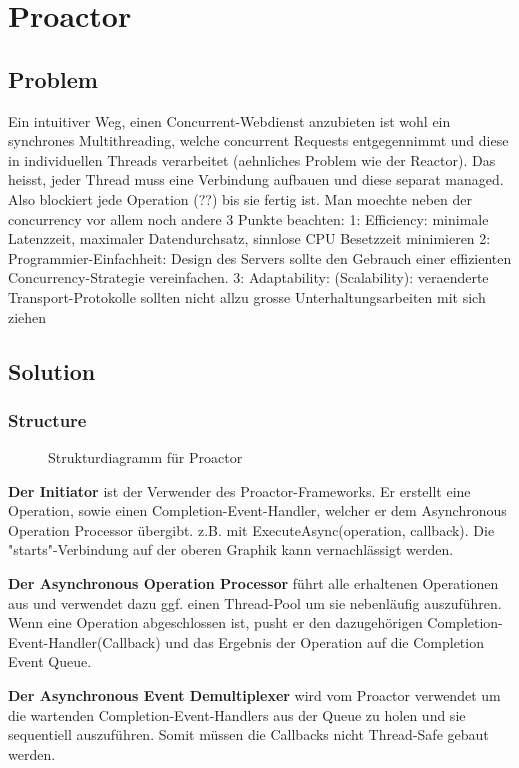 \chapter{Proactor}

\section{Problem}
Ein intuitiver Weg, einen Concurrent-Webdienst anzubieten ist wohl ein synchrones Multithreading, welche concurrent Requests entgegennimmt und diese in individuellen Threads verarbeitet (aehnliches Problem wie der Reactor). Das heisst, jeder Thread muss eine Verbindung aufbauen und diese separat managed. Also blockiert jede Operation (??) bis sie fertig ist.
Man moechte neben der concurrency vor allem noch andere 3 Punkte beachten: 1: Efficiency: minimale Latenzzeit, maximaler Datendurchsatz, sinnlose CPU Besetzzeit minimieren 2: Programmier-Einfachheit: Design des Servers sollte den Gebrauch einer effizienten Concurrency-Strategie vereinfachen. 3: Adaptability: (Scalability): veraenderte Transport-Protokolle sollten nicht allzu grosse Unterhaltungsarbeiten mit sich ziehen

\section{Solution}
\subsection{Structure}
\begin{figure}[H]
  \centering
  
  \caption{Strukturdiagramm f\"ur Proactor}
\end{figure}

\textbf{Der Initiator} ist der Verwender des Proactor-Frameworks. Er erstellt eine Operation, sowie einen Completion-Event-Handler, welcher er dem Asynchronous Operation Processor übergibt. z.B. mit ExecuteAsync(operation, callback). Die "starts"-Verbindung auf der oberen Graphik kann vernachlässigt werden.

\textbf{Der Asynchronous Operation Processor} führt alle erhaltenen Operationen aus und verwendet dazu ggf. einen Thread-Pool um sie nebenläufig auszuführen. Wenn eine Operation abgeschlossen ist, pusht er den dazugehörigen Completion-Event-Handler(Callback) und das Ergebnis der Operation auf die Completion Event Queue.

\textbf{Der Asynchronous Event Demultiplexer} wird vom Proactor verwendet um die wartenden Completion-Event-Handlers aus der Queue zu holen und sie sequentiell auszuführen. Somit müssen die Callbacks nicht Thread-Safe gebaut werden.

